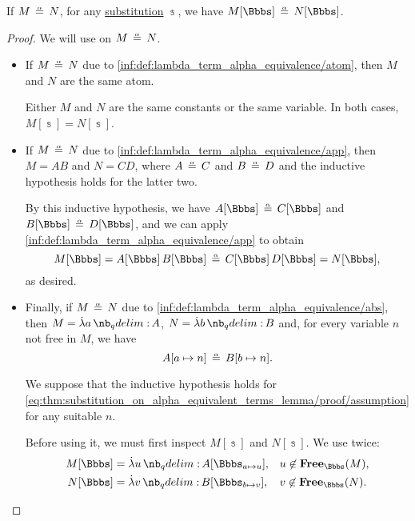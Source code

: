 \begin{proposition}\label{thm:substitution_on_alpha_equivalent_terms}
  If \( M \aequiv N \), for any \hyperref[def:lambda_term_substitution]{substitution} \( \Bbbs \), we have \( M[\Bbbs] \aequiv N[\Bbbs] \).
\end{proposition}
\begin{proof}
  We will use  on \( M \aequiv N \).

  \begin{itemize}
    \item If \( M \aequiv N \) due to \ref{inf:def:lambda_term_alpha_equivalence/atom}, then \( M \) and \( N \) are the same atom.

    Either \( M \) and \( N \) are the same constants or the same variable. In both cases, \( M[\Bbbs] = N[\Bbbs] \).

    \item If \( M \aequiv N \) due to \ref{inf:def:lambda_term_alpha_equivalence/app}, then \( M = AB \) and \( N = CD \), where \( A \aequiv C \) and \( B \aequiv D \) and the inductive hypothesis holds for the latter two.

    By this inductive hypothesis, we have \( A[\Bbbs] \aequiv C[\Bbbs] \) and \( B[\Bbbs] \aequiv D[\Bbbs] \), and we can apply \ref{inf:def:lambda_term_alpha_equivalence/app} to obtain
    \begin{equation*}
      M[\Bbbs]
      =
      A[\Bbbs] \thinspace B[\Bbbs]
      \aequiv
      C[\Bbbs] \thinspace D[\Bbbs]
      =
      N[\Bbbs],
    \end{equation*}
    as desired.

    \item Finally, if \( M \aequiv N \) due to \ref{inf:def:lambda_term_alpha_equivalence/abs}, then \( M = \qabs a A \), \( N = \qabs b B \) and, for every variable \( n \) not free in \( M \), we have
    \begin{equation}\label{eq:thm:substitution_on_alpha_equivalent_terms_lemma/proof/assumption}
      A[a \mapsto n] \aequiv B[b \mapsto n].
    \end{equation}

    We suppose that the inductive hypothesis holds for \eqref{eq:thm:substitution_on_alpha_equivalent_terms_lemma/proof/assumption} for any suitable \( n \).

    Before using it, we must first inspect \( M[\Bbbs] \) and \( N[\Bbbs] \). We use  twice:
    \begin{align*}
      M[\Bbbs] &= \qabs u A[\Bbbs_{a \mapsto u}], &&u \not\in \op*{Free}_\Bbbs(M), \\
      N[\Bbbs] &= \qabs v B[\Bbbs_{b \mapsto v}], &&v \not\in \op*{Free}_\Bbbs(N).
    \end{align*}


\end{itemize}
\end{proof}
